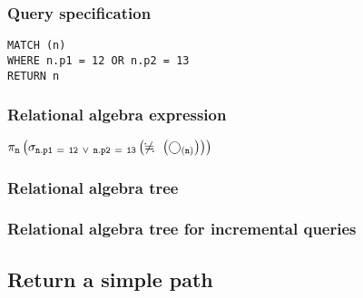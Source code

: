 \subsubsection*{Query specification}

\begin{lstlisting}
MATCH (n)
WHERE n.p1 = 12 OR n.p2 = 13
RETURN n
\end{lstlisting}

\subsubsection*{Relational algebra expression}

$\projection{\var{n}} \left(\selection{\mathtt{n.p1~=~12~\lor~n.p2~=~13}} \left(\alldifferent{} \left(\getvertices{n}{}\right)\right)\right)$

\subsubsection*{Relational algebra tree}


\subsubsection*{Relational algebra tree for incremental queries}


\subsection{Return a simple path}

